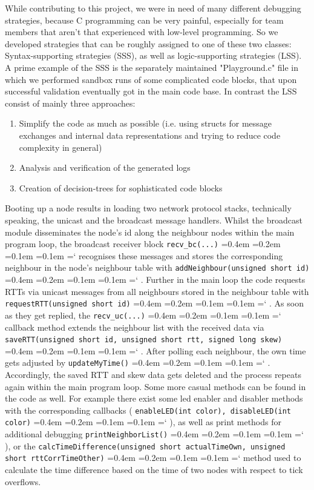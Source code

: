 \documentclass{llncs}
\newcommand{\code}[1]{%
	\texttt{#1}%
	\fontdimen2\font=0.4em
	\fontdimen3\font=0.2em
	\fontdimen4\font=0.1em
	\fontdimen7\font=0.1em
	\hyphenchar\font=`\-
}
\begin{document}
\noindent While contributing to this project, we were in need of many different debugging strategies, because C programming can be very painful, especially for team members that aren't that experienced with low-level programming.
So we developed strategies that can be roughly assigned to one of these two classes: Syntax-supporting strategies (SSS), as well as logic-supporting strategies (LSS). 
A prime example of the SSS is the separately maintained "Playground.c" file in which we performed sandbox runs of some complicated code blocks, that upon successful validation eventually got in the main code base.
In contrast the LSS consist of mainly three approaches:
\begin{enumerate}
\item Simplify the code as much as possible (i.e. using structs for message exchanges and internal data representations and trying to reduce code complexity in general)
\item Analysis and verification of the generated logs
\item Creation of decision-trees for sophisticated code blocks
\end{enumerate}
Booting up a node results in loading two network protocol stacks, technically speaking, the unicast and the broadcast message handlers. Whilst the broadcast module disseminates the node's id along the neighbour nodes within the main program loop, the broadcast receiver block \code{recv\_bc(...)} recognises these messages and stores the corresponding neighbour in the node's neighbour table with \code{addNeighbour(unsigned short id)}. Further in the main loop the code requests RTTs via unicast messages from all neighbours stored in the neighbour table with \code{requestRTT(unsigned short id)}. As soon as they get replied, the \code{recv\_uc(...)} callback method extends the neighbour list with the received data via \code{saveRTT(unsigned short id, unsigned short rtt, signed long skew)}.
After polling each neighbour, the own time gets adjusted by \code{updateMyTime()}. Accordingly, the saved RTT and skew data gets deleted and the process repeats again within the main program loop.
Some more casual methods can be found in the code as well. For example there exist some led enabler and disabler methods with the corresponding callbacks (\code{enableLED(int color), disableLED(int color)}), as well as print methods for additional debugging \code{printNeighborList()}), or the \code{calcTimeDifference(unsigned short actualTimeOwn, unsigned short rttCorrTimeOther)} method used to calculate the time difference based on the time of two nodes with respect to tick overflows.
\end{document}
